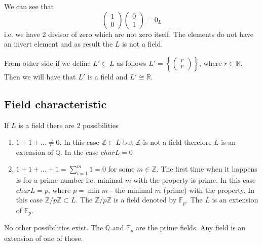 \begin{example}
  We can see that
  \[
  \left(
  \begin{array}{c}
    1 \\
    0
  \end{array}
  \right)
    \left(
  \begin{array}{c}
    0 \\
    1
  \end{array}
  \right) = 0_L
  \]
  i.e. we have 2 divisor of zero which are not zero itself. The
  elements do not have an invert element and as result the $L$ is
  not a field.

  From other side if we define $L' \subset L$ as follows
  $L' = \left\{
  \left(
  \begin{array}{c}
    r \\
    r
  \end{array}
  \right)
  \right\}$, where $r \in \mathbb{R}$.
  Then we will have that $L'$ is a field and $L' \cong \mathbb{R}$.
  \label{ex:kalgebranotfield}
\end{example}

\subsection{Field characteristic}
\label{sec:fieldcharacteristic}
If $L$ is a field there are 2 possibilities
\begin{enumerate}
\item $1 + 1 + \dots \ne 0$. In this case
  $\mathbb{Z} \subset L$ but $\mathbb{Z}$ is not a field therefore $L$
  is an extension of $\mathbb{Q}$. In the case $char L = 0$
  \item $1 + 1 + \dots + 1 = \sum_{i = 1}^m 1 = 0$ for some $m \in
    \mathbb{Z}$. The first time when it happens is for a prime number
    i.e. minimal $m$ with the property is prime. In this case $char L
    = p$, where $p = \min m$  - the minimal $m$ (prime) with the
    property. In this 
    case $\mathbb{Z}/p\mathbb{Z} \subset L$. The
    $\mathbb{Z}/p\mathbb{Z}$ is a field denoted by $\mathbb{F}_p$. The
    $L$ is an extension of $\mathbb{F}_p$.
\end{enumerate}
No other possibilities exist. The $\mathbb{Q}$ and $\mathbb{F}_p$ are
the prime fields. Any field is an extension of one of those.

